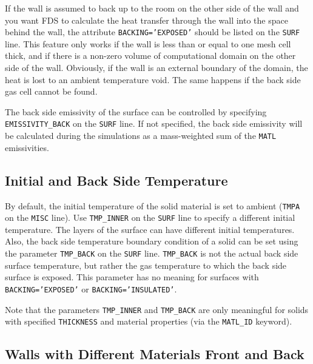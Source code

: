 \documentclass[11pt]{book}
\newcommand{\ct}{\tt\small}
\begin{document}
If the wall is assumed to back up to the room on the other side of
the wall and you want FDS to calculate the heat transfer
through the wall into the space behind the wall, the attribute
{\ct BACKING='EXPOSED'} should be listed on the {\ct SURF} line. This feature only works
if the wall is less than or equal to one mesh cell thick, and if there is a non-zero volume
of computational domain on the other side of the wall. Obviously, if
the wall is an external boundary of the domain, the heat is lost to an ambient temperature void. The same happens if the back side
gas cell cannot be found.

The back side emissivity of the surface can be controlled by specifying {\ct EMISSIVITY\_BACK} on the {\ct SURF} line. If not specified, the back side
emissivity will be calculated during the simulations as a mass-weighted sum of the {\ct MATL} emissivities.

\subsection{Initial and Back Side Temperature}

\label{info:TMP_INNER}

By default, the initial temperature of the solid material is set to
ambient ({\ct TMPA} on the {\ct MISC} line). Use {\ct TMP\_INNER} on the {\ct SURF} line to
specify a different initial temperature. The layers of the surface can have different initial temperatures.
Also, the back side temperature boundary condition of a solid can be
set using the parameter {\ct TMP\_BACK} on the {\ct SURF}
line. {\ct TMP\_BACK} is not the actual back side surface temperature,
but rather the gas temperature to which the back side surface is exposed. This
parameter has no meaning for surfaces with {\ct BACKING='EXPOSED'} or
{\ct BACKING='INSULATED'}.

\begin{warning}
\noindent
Note that the parameters {\ct TMP\_INNER} and {\ct TMP\_BACK} are only meaningful for solids with specified {\ct THICKNESS} and material
properties (via the {\ct MATL\_ID} keyword).
\end{warning}



\subsection{Walls with Different Materials Front and Back}
\label{info:EXPOSED}
\end{document}
